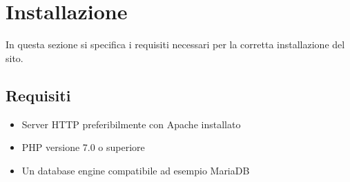 \section{Installazione}
In questa sezione si specifica i requisiti necessari per la corretta installazione del sito.
\subsection{Requisiti}
\begin{itemize}
\item Server HTTP preferibilmente con Apache installato
\item PHP versione 7.0 o superiore
\item Un database engine compatibile ad esempio MariaDB
\end{itemize}
